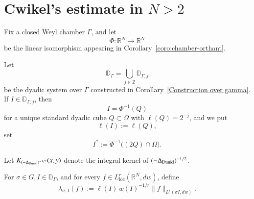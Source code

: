 \documentclass[12pt]{amsart}
\begin{document}
%

\section{Cwikel's estimate in $N>2$}
\begin{nota}
Fix a closed Weyl chamber $\Gamma$, and let
\[
\Phi:\mathbb R^N\longrightarrow\mathbb R^N
\]
be the linear isomorphism appearing in
Corollary~\ref{coro:chamber-orthant}.


Let
\[
\mathbb D_\Gamma
=
\bigcup_{j\in\mathbb Z}\mathbb D_{\Gamma,j}
\]
be the dyadic system over $\Gamma$ constructed in
Corollary~\ref{Construction over gamma}.
If
$I\in\mathbb D_{\Gamma,j}$, then
\[
I=\Phi^{-1}(Q)
\]
for a unique standard dyadic cube $Q\subset\Omega$ with
$\ell(Q)=2^{-j}$, and we put
\[
\ell(I):=\ell(Q),
\]
set
\[
I^\ast
:=
\Phi^{-1}\bigl((2Q)\cap\Omega\bigr).
\]


Let $K_{(-\Delta_{{\rm Dunkl}})^{-1/2}}(x,y)$ denote the integral kernel of
$(-\Delta_{{\rm Dunkl}})^{-1/2}$.

For $\sigma\in G,I\in\mathbb D_\Gamma$, and for every
$f\in L^r_{\mathrm{loc}}(\mathbb R^N,dw)$, define
\begin{equation}\label{eq:Dunkl-lambda-rank-one}
\lambda_{\sigma,I}(f)
:=
\ell(I)\,
w(I)^{-1/r}
\|f\|_{L^r(\sigma I,dw)}
.
\end{equation}
\end{nota}
\end{document}
